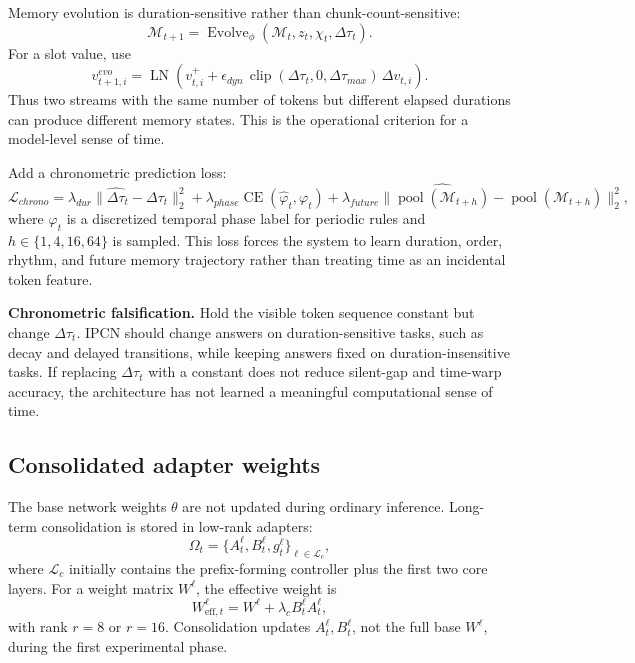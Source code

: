 \documentclass[11pt]{article}
\newcommand{\LN}{\operatorname{LN}}
\newcommand{\Evolve}{\operatorname{Evolve}}
\newcommand{\Mem}{\mathcal{M}}
\begin{document}
Memory evolution is duration-sensitive rather than chunk-count-sensitive:
\begin{equation}
    \Mem_{t+1}=\Evolve_\phi(\Mem_t,z_t,\chi_t,\Delta\tau_t).
\end{equation}
For a slot value, use
\begin{equation}
    v_{t+1,i}^{evo}=\LN\left(v_{t,i}^{+}+\epsilon_{dyn}\,\operatorname{clip}(\Delta\tau_t,0,\Delta\tau_{max})\,\Delta v_{t,i}\right).
\end{equation}
Thus two streams with the same number of tokens but different elapsed durations can produce different memory states. This is the operational criterion for a model-level sense of time.

Add a chronometric prediction loss:
\begin{equation}
    \mathcal{L}_{chrono}=\lambda_{dur}\|\hat{\Delta\tau}_t-\Delta\tau_t\|_2^2+\lambda_{phase}\operatorname{CE}(\hat{\varphi}_t,\varphi_t)+\lambda_{future}\|\widehat{\operatorname{pool}(\Mem_{t+h})}-\operatorname{pool}(\Mem_{t+h})\|_2^2,
\end{equation}
where \(\varphi_t\) is a discretized temporal phase label for periodic rules and \(h\in\{1,4,16,64\}\) is sampled. This loss forces the system to learn duration, order, rhythm, and future memory trajectory rather than treating time as an incidental token feature.

\begin{specbox}
\textbf{Chronometric falsification.} Hold the visible token sequence constant but change \(\Delta\tau_t\). IPCN should change answers on duration-sensitive tasks, such as decay and delayed transitions, while keeping answers fixed on duration-insensitive tasks. If replacing \(\Delta\tau_t\) with a constant does not reduce silent-gap and time-warp accuracy, the architecture has not learned a meaningful computational sense of time.
\end{specbox}

\subsection{Consolidated adapter weights}

The base network weights \(\theta\) are not updated during ordinary inference. Long-term consolidation is stored in low-rank adapters:
\begin{equation}
    \Omega_t = \{A_t^\ell,B_t^\ell,g_t^\ell\}_{\ell\in\mathcal{L}_c},
\end{equation}
where \(\mathcal{L}_c\) initially contains the prefix-forming controller plus the first two core layers. For a weight matrix \(W^\ell\), the effective weight is
\begin{equation}
    W_{\text{eff},t}^\ell = W^\ell + \lambda_c B_t^\ell A_t^\ell,
\end{equation}
with rank \(r=8\) or \(r=16\). Consolidation updates \(A_t^\ell,B_t^\ell\), not the full base \(W^\ell\), during the first experimental phase.
\end{document}
